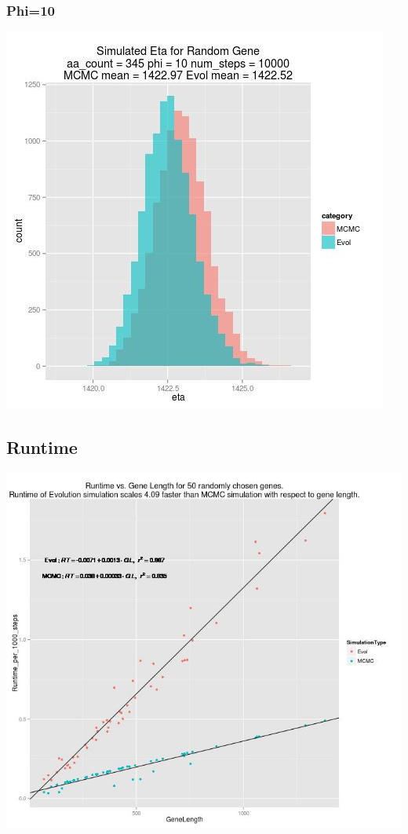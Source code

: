 \documentclass{article}
\begin{document}
\subsubsection{Phi=10}
\includegraphics[scale=0.5]{../eta_distbns/10_phi.jpg}

\subsection{Runtime}
\includegraphics[scale=0.5]{../runtime/Runtime_plot_random_50.jpg}
\end{document}
